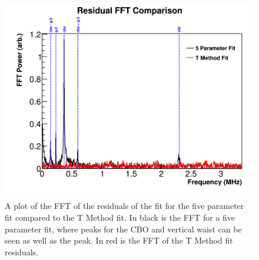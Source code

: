 	\begin{figure}[]
		\centering
		\includegraphics[width=\textwidth]{FFTComparison_TMethod}
	    \caption[FFTComparison_TMethod]{A plot of the FFT of the residuals of the fit for the five parameter fit compared to the T Method fit. In black is the FFT for a five parameter fit, where peaks for the CBO and vertical waist can be seen as well as the \gmtwo peak. In red is the FFT of the T Method fit residuals.}
	    \label{fig:FFTComparison_TMethod}
	\end{figure}


